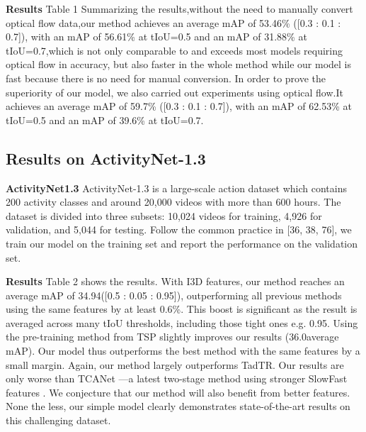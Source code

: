 \documentclass[10pt,twocolumn,letterpaper]{article}
\begin{document}
\textbf{Results}
Table 1 Summarizing the results,without the need to manually convert optical flow data,our method achieves an average mAP of 53.46\% ([0.3 : 0.1 : 0.7]), with
an mAP of 56.61\% at tIoU=0.5 and an mAP of 31.88\% at
tIoU=0.7,which is not only comparable to and exceeds most models requiring optical flow in accuracy, but also faster in the whole method while our model is fast because there is no need for manual conversion. In order to prove the superiority of our model, we also carried out experiments using optical flow.It achieves an average mAP of 59.7\% ([0.3 : 0.1 : 0.7]), with
an mAP of 62.53\% at tIoU=0.5 and an mAP of 39.6\% at
tIoU=0.7.
\subsection{ Results on ActivityNet-1.3}
\textbf{ActivityNet1.3} ActivityNet-1.3 is a large-scale action dataset
which contains 200 activity classes and around 20,000 videos
with more than 600 hours. The dataset is divided into three
subsets: 10,024 videos for training, 4,926 for validation, and
5,044 for testing. Follow the common practice in [36, 38,
76], we train our model on the training set and report the
performance on the validation set.

\textbf{Results}
Table 2 shows the results. With I3D
features, our method reaches an average mAP of 34.94([0.5 : 0.05 : 0.95]), outperforming all previous methods
using the same features by at least 0.6\%. This boost is significant as the result is averaged across many tIoU thresholds,
including those tight ones e.g. 0.95. Using the pre-training
method from TSP slightly improves our results (36.0average mAP). Our model thus outperforms the best method
with the same features by a small margin. Again, our
method largely outperforms TadTR. Our results are
only worse than TCANet —a latest two-stage method
using stronger SlowFast features . We conjecture that
our method will also benefit from better features. None the less, our simple model clearly demonstrates state-of-the-art
results on this challenging dataset.
\end{document}
